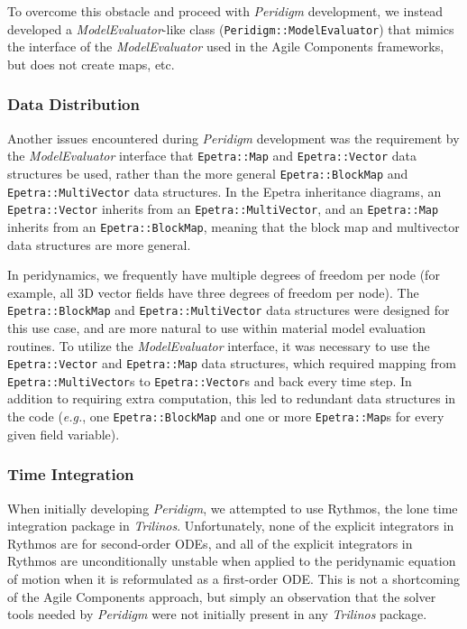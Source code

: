 \documentclass[pdf,ps2pdf,12pt,report]{SANDreport}
\theoremstyle{plain}
\theoremstyle{definition}
\theoremstyle{remark}
\numberwithin{equation}{section}
\begin{document}
To overcome this obstacle and proceed with \emph{Peridigm} development, we instead developed a \emph{ModelEvaluator}-like class (\texttt{Peridigm::ModelEvaluator}) that mimics the interface of the \emph{ModelEvaluator} used in the Agile Components frameworks, but does not create maps, etc.

\subsubsection{Data Distribution}

Another issues encountered during \emph{Peridigm} development was the requirement by the \emph{ModelEvaluator} interface that \texttt{Epetra::Map} and \texttt{Epetra::Vector} data structures be used, rather than the more general \texttt{Epetra::BlockMap} and \texttt{Epetra::MultiVector} data structures. In the Epetra inheritance diagrams, an \texttt{Epetra::Vector} inherits from an \texttt{Epetra::MultiVector}, and an \texttt{Epetra::Map} inherits from an \texttt{Epetra::BlockMap}, meaning that the block map and multivector data structures are more general.

In peridynamics, we frequently have multiple degrees of freedom per node (for example, all 3D vector fields have three degrees of freedom per node). The \texttt{Epetra::BlockMap} and \texttt{Epetra::MultiVector} data structures were designed for this use case, and are more natural to use within material model evaluation routines. To utilize the \emph{ModelEvaluator} interface, it was necessary to use the \texttt{Epetra::Vector} and \texttt{Epetra::Map} data structures, which required mapping from \texttt{Epetra::MultiVector}s to \texttt{Epetra::Vector}s and back every time step. In addition to requiring extra computation, this led to redundant data structures in the code (\emph{e.g.}, one \texttt{Epetra::BlockMap} and one or more \texttt{Epetra::Map}s for every given field variable).

\subsubsection{Time Integration}

When initially developing \emph{Peridigm}, we attempted to use Rythmos, the lone time integration package in \emph{Trilinos}. Unfortunately, none of the explicit integrators in Rythmos are for second-order ODEs, and all of the explicit integrators in Rythmos are unconditionally unstable when applied to the peridynamic equation of motion when it is reformulated as a first-order ODE. This is not a shortcoming of the Agile Components approach, but simply an observation that the solver tools needed by \emph{Peridigm} were not initially present in any \emph{Trilinos} package.
\end{document}
